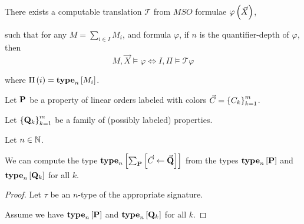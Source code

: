 \begin{theorem}
  There exists a computable translation $\mathcal{T}$
  from $MSO$ formulae $\varphi \left( {\vec{X}} \right)$,

  such that for any $M = \sum_{i \in I} M_i$, and formula $\varphi$,
  if $n$ is the quantifier-depth of $\varphi$,
  then
  \[
    M, \vec{X} \models \varphi \iff I, \Pi \models \mathcal{T} {\varphi}
  \]

  where $\Pi \left( {i} \right) = \mathbf{type}_{n} \left[ {M_i} \right]$.
\end{theorem}

\begin{corollary}
  Let $\mathbf{P}$ be a property of linear orders
  labeled with colors $\vec{C} = \left\{ {C_k} \right\}_{k=1}^m$.

  Let $\left\{ {\mathbf{Q}_k} \right\}_{k=1}^m$ be a family of (possibly labeled) properties.

  Let $n \in \mathbb{N}$.

  We can compute the type $\mathbf{type}_{n} \left[ {\sum_{\mathbf{P}} \left[ {{\vec{C}} \leftarrow {\vec{\mathbf{Q}}}} \right]} \right]$
  from the types $\mathbf{type}_{n} \left[ {\mathbf{P}} \right]$ and $\mathbf{type}_{n} \left[ {\mathbf{Q}_k} \right]$ for all $k$.
\end{corollary}

\begin{proof}
  Let $\tau$ be an $n$-type of the appropriate signature.
  
  Assume we have $\mathbf{type}_{n} \left[ {\mathbf{P}} \right]$ and $\mathbf{type}_{n} \left[ {\mathbf{Q}_k} \right]$ for all $k$.
\end{proof}